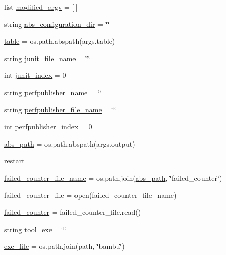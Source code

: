 \begin{DoxyCompactItemize}
list \hyperlink{namespacetest__panda_a7f244fa9799d45d02e0f266989bf16f7}{modified\+\_\+argv} = \mbox{[}$\,$\mbox{]}
\item 
string \hyperlink{namespacetest__panda_ae81c2fb49691eabd091c55b5c5fdba1c}{abs\+\_\+configuration\+\_\+dir} = \char`\"{}\char`\"{}
\item 
\hyperlink{namespacetest__panda_a73f08524774fa123c28bae298d21f00b}{table} = os.\+path.\+abspath(args.\+table)
\item 
string \hyperlink{namespacetest__panda_aa375f80f1bb5f774d7bcfd9d4ded3f5c}{junit\+\_\+file\+\_\+name} = \char`\"{}\char`\"{}
\item 
int \hyperlink{namespacetest__panda_a93326ecb2c8f4fec6e8aeb524f189803}{junit\+\_\+index} = 0
\item 
string \hyperlink{namespacetest__panda_adfd44e99cf4192d4d665015174c44fd0}{perfpublisher\+\_\+name} = \char`\"{}\char`\"{}
\item 
string \hyperlink{namespacetest__panda_ae3bf09732ecacf6c06a7180d67d25a9e}{perfpublisher\+\_\+file\+\_\+name} = \char`\"{}\char`\"{}
\item 
int \hyperlink{namespacetest__panda_a3dbe52cf1db39231763a58776376a670}{perfpublisher\+\_\+index} = 0
\item 
\hyperlink{namespacetest__panda_a78bb23566d04ac65a03195681449d2c0}{abs\+\_\+path} = os.\+path.\+abspath(args.\+output)
\item 
\hyperlink{namespacetest__panda_ac89fb7442391f9c56e37c5753f364a5d}{restart}
\item 
\hyperlink{namespacetest__panda_a09e8b74e2e77debdfd45401dbc0502c7}{failed\+\_\+counter\+\_\+file\+\_\+name} = os.\+path.\+join(\hyperlink{namespacetest__panda_a78bb23566d04ac65a03195681449d2c0}{abs\+\_\+path}, \char`\"{}failed\+\_\+counter\char`\"{})
\item 
\hyperlink{namespacetest__panda_a78641fc5dd6016d8f6dbae2d57f3e478}{failed\+\_\+counter\+\_\+file} = open(\hyperlink{namespacetest__panda_a09e8b74e2e77debdfd45401dbc0502c7}{failed\+\_\+counter\+\_\+file\+\_\+name})
\item 
\hyperlink{namespacetest__panda_a18cce99b42af4f268075fe72884430eb}{failed\+\_\+counter} = failed\+\_\+counter\+\_\+file.\+read()
\item 
string \hyperlink{namespacetest__panda_aa66614fd26a88bcc42712e9cd7b87797}{tool\+\_\+exe} = \char`\"{}\char`\"{}
\item 
\hyperlink{namespacetest__panda_afba98406f8d428e9ba9169e9539397cf}{exe\+\_\+file} = os.\+path.\+join(path, \char`\"{}bambu\char`\"{})

\end{DoxyCompactItemize}
